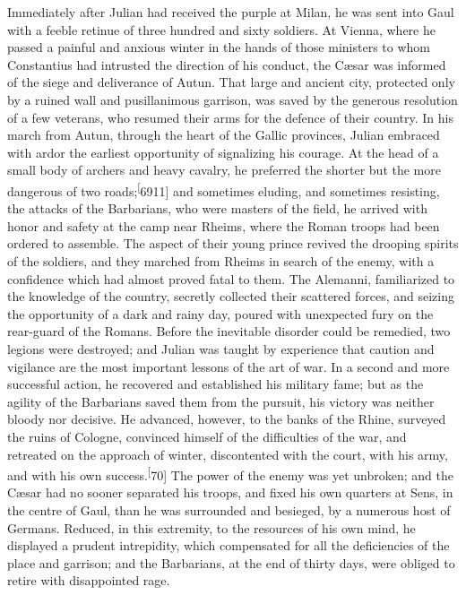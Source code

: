 Immediately after Julian had received the purple at Milan, he was
sent into Gaul with a feeble retinue of three hundred and sixty
soldiers. At Vienna, where he passed a painful and anxious winter
in the hands of those ministers to whom Constantius had intrusted
the direction of his conduct, the Cæsar was informed of the siege
and deliverance of Autun. That large and ancient city, protected
only by a ruined wall and pusillanimous garrison, was saved by
the generous resolution of a few veterans, who resumed their arms
for the defence of their country. In his march from Autun,
through the heart of the Gallic provinces, Julian embraced with
ardor the earliest opportunity of signalizing his courage. At the
head of a small body of archers and heavy cavalry, he preferred
the shorter but the more dangerous of two roads;\textsuperscript[6911] and
sometimes eluding, and sometimes resisting, the attacks of the
Barbarians, who were masters of the field, he arrived with honor
and safety at the camp near Rheims, where the Roman troops had
been ordered to assemble. The aspect of their young prince
revived the drooping spirits of the soldiers, and they marched
from Rheims in search of the enemy, with a confidence which had
almost proved fatal to them. The Alemanni, familiarized to the
knowledge of the country, secretly collected their scattered
forces, and seizing the opportunity of a dark and rainy day,
poured with unexpected fury on the rear-guard of the Romans.
Before the inevitable disorder could be remedied, two legions
were destroyed; and Julian was taught by experience that caution
and vigilance are the most important lessons of the art of war.
In a second and more successful action, he recovered and
established his military fame; but as the agility of the
Barbarians saved them from the pursuit, his victory was neither
bloody nor decisive. He advanced, however, to the banks of the
Rhine, surveyed the ruins of Cologne, convinced himself of the
difficulties of the war, and retreated on the approach of winter,
discontented with the court, with his army, and with his own
success.\textsuperscript[70] The power of the enemy was yet unbroken; and the
Cæsar had no sooner separated his troops, and fixed his own
quarters at Sens, in the centre of Gaul, than he was surrounded
and besieged, by a numerous host of Germans. Reduced, in this
extremity, to the resources of his own mind, he displayed a
prudent intrepidity, which compensated for all the deficiencies
of the place and garrison; and the Barbarians, at the end of
thirty days, were obliged to retire with disappointed rage.

